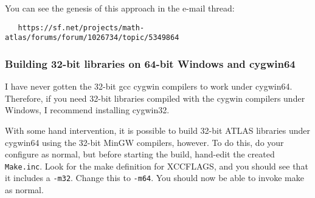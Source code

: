 \documentclass[11pt]{article}
\begin{document}
You can see the genesis of this approach in the e-mail thread:
\begin{verbatim}
   https://sf.net/projects/math-atlas/forums/forum/1026734/topic/5349864
\end{verbatim}

\subsubsection{Building 32-bit libraries on 64-bit Windows and cygwin64}
\label{sec-Win64-32}
I have never gotten the 32-bit gcc cygwin compilers to work under cygwin64.
Therefore, if you need 32-bit libraries compiled with the cygwin compilers
under Windows, I recommend installing cygwin32.

With some hand intervention, it is possible to build  32-bit ATLAS libraries
under cygwin64 using the 32-bit MinGW compilers, however.  To do this, do your
configure as normal, but before starting the build, hand-edit the created
{\tt Make.inc}.  Look for the make definition for XCCFLAGS, and you should
see that it includes a \texttt{-m32}.  Change this to \texttt{-m64}.  You
should now be able to invoke make as normal.
\end{document}
